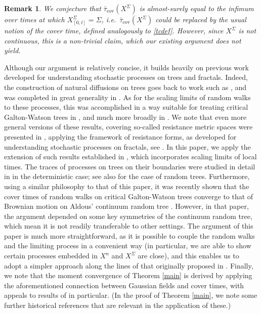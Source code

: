 \documentclass[a4paper, 11pt]{article}
\newtheorem{rem}[theorem]{Remark}
\begin{document}
\begin{rem}
We conjecture that $\bar{\tau}_{\mathrm{cov}}(X^\Sigma)$ is almost-surely equal to the infimum over times at which ${X^\Sigma_{[0,t]}}=\Sigma$, i.e.\ $\bar{\tau}_{\mathrm{cov}}(X^\Sigma)$ could be replaced by the usual notion of the cover time, defined analogously to \eqref{tcdef}. However, since $X^\Sigma$ is not continuous, this is a non-trivial claim, which our existing argument does not yield.
\end{rem}

Although our argument is relatively concise, it builds heavily on previous work developed for understanding stochastic processes on trees and fractals. Indeed, the construction of natural diffusions on trees goes back to work such as \cite{Kigden,Krebs}, and was completed in great generality in \cite{AEW}. As for the scaling limits of random walks to these processes, this was accomplished in a way suitable for treating critical Galton-Watson trees in \cite{Cr1,Cr2}, and much more broadly in \cite{ALW}. We note that even more general versions of these results, covering so-called resistance metric spaces were presented in \cite{Cr3,CHK}, applying the framework of resistance forms, as developed for understanding stochastic processes on fractals, see \cite{AOF,Kigres}. In this paper, we apply the extension of such results established in \cite{Noda}, which incorporates scaling limits of local times. The traces of processes on trees on their boundaries were studied in detail in \cite{Kigbound,Kigbound2} in the deterministic case; see also \cite{Tokushige} for the case of random trees. Furthermore, using a similar philosophy to that of this paper, it was recently shown that the cover times of random walks on critical Galton-Watson trees converge to that of Brownian motion on Aldous' continuum random tree \cite{ACMM}. However, in that paper, the argument depended on some key symmetries of the continuum random tree, which mean it is not readily transferable to other settings. The argument of this paper is much more straightforward, as it is possible to couple the random walks and the limiting process in a convenient way (in particular, we are able to show certain processes embedded in $X^n$ and $X^\Sigma$ are close), and this enables us to adopt a simpler approach along the lines of that originally proposed in \cite{CLLT}. Finally, we note that the moment convergence of Theorem \ref{main} is derived by applying the aforementioned connection between Gaussian fields and cover times, with appeals to results of \cite{DLP,Zhai} in particular. (In the proof of Theorem \ref{main}, we note some further historical references that are relevant in the application of these.)
\end{document}
